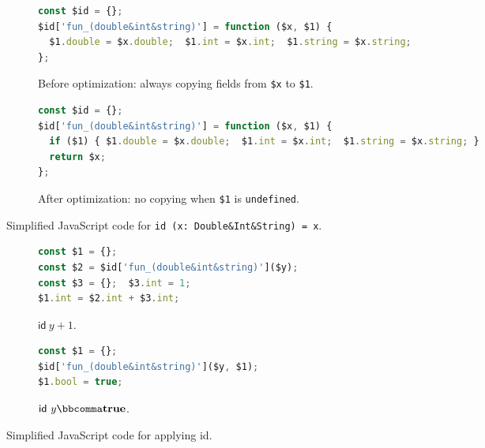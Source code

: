 \begin{figure}
\begin{subfigure}{\textwidth}
\begin{lstlisting}[language=TypeScript,deletekeywords=string]
const $id = {};
$id['fun_(double&int&string)'] = function ($x, $1) {
  $1.double = $x.double;  $1.int = $x.int;  $1.string = $x.string;
};
\end{lstlisting}
\caption{Before optimization: always copying fields from \lstinline{$x} to \lstinline{$1}.}
\label{fig:id-before}
\end{subfigure}
\par\bigskip
\begin{subfigure}{\textwidth}
\begin{lstlisting}[language=TypeScript,deletekeywords=string]
const $id = {};
$id['fun_(double&int&string)'] = function ($x, $1) {
  if ($1) { $1.double = $x.double;  $1.int = $x.int;  $1.string = $x.string; }
  return $x;
};
\end{lstlisting}
\caption{After optimization: no copying when \lstinline{$1} is \lstinline{undefined}.}
\label{fig:id-after}
\end{subfigure}
\caption{Simplified JavaScript code for \lstinline{id (x: Double&Int&String) = x}.}
\label{fig:id-before-after}
\end{figure}

\begin{figure}
\begin{subfigure}{.55\textwidth}
\begin{lstlisting}[language=TypeScript,deletekeywords=string]
const $1 = {};
const $2 = $id['fun_(double&int&string)']($y);
const $3 = {};  $3.int = 1;
$1.int = $2.int + $3.int;
\end{lstlisting}
\caption{$\textsf{id}\ y + 1$.} \label{fig:id-plus}
\end{subfigure}%
\begin{subfigure}{.45\textwidth}
\begin{lstlisting}[language=TypeScript,deletekeywords=string]
const $1 = {};
$id['fun_(double&int&string)']($y, $1);
$1.bool = true;
\end{lstlisting}
\caption{$\textsf{id}\ y \bbcomma  \mathbf{true} $.} \label{fig:id-merge}
\end{subfigure}
\caption{Simplified JavaScript code for applying \textsf{id}.}
\label{fig:id-plus-merge}
\end{figure}

